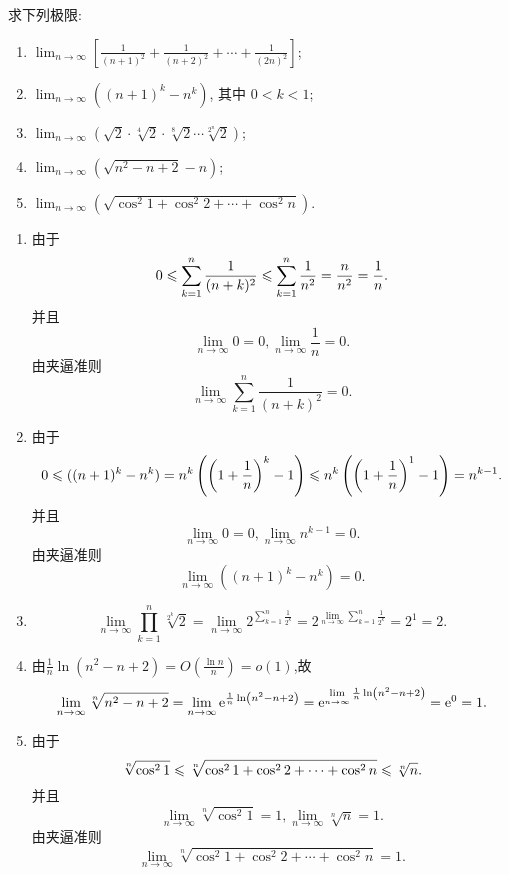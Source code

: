 \begin{exercise}[1.2.15]
    求下列极限:
    \begin{enumerate}[(1)]
        \item $\lim_{n\to\infty} \left[\frac{1}{(n+1)^2} + \frac{1}{(n+2)^2} + \cdots + \frac{1}{(2n)^2}\right]$;
        \item $\lim_{n\to\infty} ((n+1)^k - n^k)$, 其中 $0 < k < 1$;
        \item $\lim_{n\to\infty} (\sqrt{2} \cdot \sqrt[4]{2} \cdot \sqrt[8]{2} \cdots \sqrt[2^n]{2})$;
        \item $\lim_{n\to\infty} \left(\sqrt{n^2 - n + 2} - n\right)$;
        \item $\lim_{n\to\infty} \left(\sqrt{\cos^2 1 + \cos^2 2 + \cdots + \cos^2 n}\right)$.
    \end{enumerate}
\end{exercise}

\begin{solution}
    \begin{enumerate}[(1)]
        \item 由于$$0\leqslant \sum_{k=1}^{n} \frac{1}{(n+k)^2} \leqslant \sum_{k=1}^{n} \frac{1}{n^2} = \frac{n}{n^2} = \frac{1}{n}.$$
              并且$$\lim_{n\to\infty} 0 = 0,\lim_{n\to\infty} \frac{1}{n} = 0.$$
              由夹逼准则$$\lim_{n\to\infty}\sum_{k=1}^{n} \frac{1}{(n+k)^2}=0.$$
        \item 由于$$0\leqslant ((n+1)^k - n^k) = n^k \left( \left( 1 + \frac{1}{n} \right)^k - 1 \right) \leqslant n^k \left( \left( 1 + \frac{1}{n} \right)^1 - 1 \right)  = n^{k-1} .$$
              并且$$\lim_{n\to\infty} 0=0,\lim_{n\to\infty} n^{k-1} = 0.$$
              由夹逼准则$$\lim_{n\to\infty} ((n+1)^k - n^k)  = 0.$$
        \item $$\lim_{n\to\infty} \prod_{k=1}^{n} \sqrt[2^k]{2} = \lim_{n\to\infty} 2^{\sum\limits_{k=1}^{n} \frac{1}{2^k}} =  2^{\lim\limits_{n\to\infty}\sum\limits_{k=1}^{n} \frac{1}{2^k}} =2^1 = 2.$$
        \item 由$\frac{1}{n} \ln(n^2 - n + 2) = O\left( \frac{\ln n}{n} \right) = o(1)$,故
              $$\lim_{n\to\infty} \sqrt[n]{n^2 - n + 2} = \lim_{n\to\infty} \mathrm{e}^{ \frac{1}{n} \ln \left(n^2 - n + 2\right)} =\mathrm{e}^{\lim\limits_{n\to\infty} \frac{1}{n} \ln \left(n^2 - n + 2\right)} = \mathrm{e}^0 = 1.$$

        \item 由于$$\sqrt[n]{\cos^2 1} \leqslant \sqrt[n]{\cos^2 1 + \cos^2 2 + \cdots + \cos^2 n} \leqslant \sqrt[n]{n}.$$
              并且$$\lim_{n\to\infty} \sqrt[n]{\cos^2 1} =1,\lim_{n\to\infty} \sqrt[n]{n} = 1.$$
              由夹逼准则$$\lim_{n\to\infty} \sqrt[n]{\cos^2 1 + \cos^2 2 + \cdots + \cos^2 n} = 1.$$
    \end{enumerate}
\end{solution}

